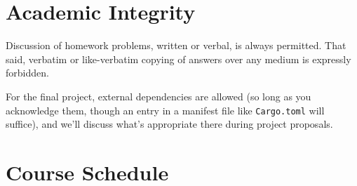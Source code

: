 \documentclass{article}
\begin{document}
\section*{Academic Integrity}

Discussion of homework problems, written or verbal, is always permitted. That
said, verbatim or like-verbatim copying of answers over any medium is expressly
forbidden.

For the final project, external dependencies are allowed (so long as you
acknowledge them, though an entry in a manifest file like \texttt{Cargo.toml}
will suffice), and we'll discuss what's appropriate there during project
proposals.

\section*{Course Schedule}
\end{document}
